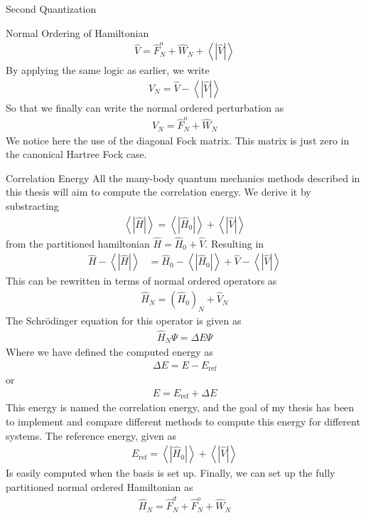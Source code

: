 \documentclass[twoside,english]{uiofysmaster}
\begin{document}
\begin{chapter}{Second Quantization}
\begin{section}{Normal Ordering of Hamiltonian}
		\begin{align}
			\hat V = \hat F_N^o + \hat W_N + \left< \right. | \hat V | \left. \right>
		\end{align}
		By applying the same logic as earlier, we write
		\begin{align}
			\hat V_N = \hat V - \left< \right. | \hat V | \left. \right>
		\end{align}
		So that we finally can write the normal ordered perturbation as
		\begin{align}
			\hat V_N = \hat F_N^o + \hat W_N
		\end{align}
		We notice here the use of the diagonal Fock matrix. This matrix is just zero in the canonical Hartree Fock case. 
	\end{section}

	\begin{section}{Correlation Energy}
		All the many-body quantum mechanics methods described in this thesis will aim to compute the correlation energy. We derive it by substracting 
		\begin{align}
			\left< \right. | \hat H | \left. \right> = \left< \right. | \hat H_0 | \left. \right> + \left< \right. | \hat V | \left. \right>
		\end{align}
		from the partitioned hamiltonian $\hat H = \hat H_0 + \hat V$. Resulting in
		\begin{align}
			\hat H - \left< \right. | \hat H | \left. \right> &= \hat H_0 - \left< \right. | \hat H_0 | \left. \right> + \hat V - \left< \right. |\hat V| \left. \right>
		\end{align}
		This can be rewritten in terms of normal ordered operators as 
		\begin{align}
			\hat H_N = (\hat H_0)_N + \hat V_N
		\end{align}
		The Schrödinger equation for this operator is given as
		\begin{align}
			\hat H_N \Psi = \Delta E \Psi 
		\end{align}
		Where we have defined the computed energy as
		\begin{align}
			\Delta E = E - E_{\text{ref}}
		\end{align}
		or 
		\begin{align}
			E = E_{\text{ref}} + \Delta E
		\end{align}
		This energy is named the correlation energy, and the goal of my thesis has been to implement and compare different methods to compute this energy for different systems. The reference energy, given as
		\begin{align}
			E_{\text{ref}} = \left< \right. | \hat H_0 | \left. \right> + \left< \right. | \hat V | \left. \right>
		\end{align}
		Is easily computed when the basis is set up. Finally, we can set up the fully partitioned normal ordered Hamiltonian as
		\begin{align}
			\hat H_N = \hat F_N^d + \hat F_N^o + \hat W_N
		\end{align}


\end{section}
\end{chapter}
\end{document}
